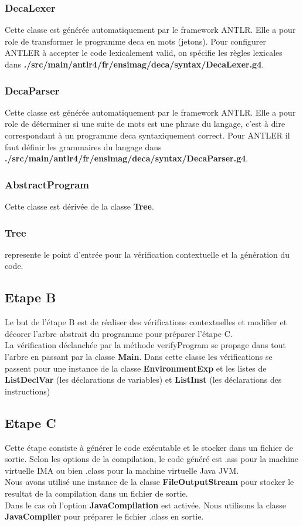 \documentclass[12pt, a4paper, one side]{article}
\begin{document}
    \subsubsection{DecaLexer} Cette classe est générée automatiquement par le framework ANTLR. Elle a pour role de transformer le programme deca en mots (jetons). Pour configurer ANTLER à accepter le code lexicalement valid, on spécifie les règles lexicales dans \textbf{./src/main/antlr4/fr/ensimag/deca/syntax/DecaLexer.g4}.

    \subsubsection{DecaParser} Cette classe est générée automatiquement par le framework ANTLR. Elle a pour role de déterminer si une suite de mots est une phrase du langage, c'est à dire correspondant à un programme deca syntaxiquement correct. Pour ANTLER il faut définir les grammaires du langage dans \textbf{./src/main/antlr4/fr/ensimag/deca/syntax/DecaParser.g4}.
    \subsubsection{AbstractProgram} Cette classe est dérivée de la classe \textbf{Tree}.

    \subsubsection{Tree} represente le point d'entrée pour la vérification contextuelle et la génération du code.

    \subsection{Etape B}
    Le but de l'étape B est de réaliser des vérifications contextuelles et modifier et décorer l'arbre abstrait du programme pour préparer l'étape C.
    \\
    La vérification déclanchée par la méthode verifyProgram se propage dans tout l'arbre en passant par la classe \textbf{Main}. Dans cette classe les vérifications se passent pour une instance de la classe \textbf{EnvironmentExp} et les listes de \textbf{ListDeclVar} (les déclarations de variables) et \textbf{ListInst} (les déclarations des instructions)

    \subsection{Etape C}
    Cette étape consiste à générer le code exécutable et le stocker dans un fichier de sortie. Selon les options de la compilation, le code généré est .ass pour la machine virtuelle IMA ou bien .class pour la machine virtuelle Java JVM.
    \\
    Nous avons utilisé une instance de la classe \textbf{FileOutputStream} pour stocker le resultat de la compilation dans un fichier de sortie.\\
    Dans le cas où l'option \textbf{JavaCompilation} est activée. Nous utilisons la classe \textbf{JavaCompiler} pour préparer le fichier .class en sortie.
\end{document}
